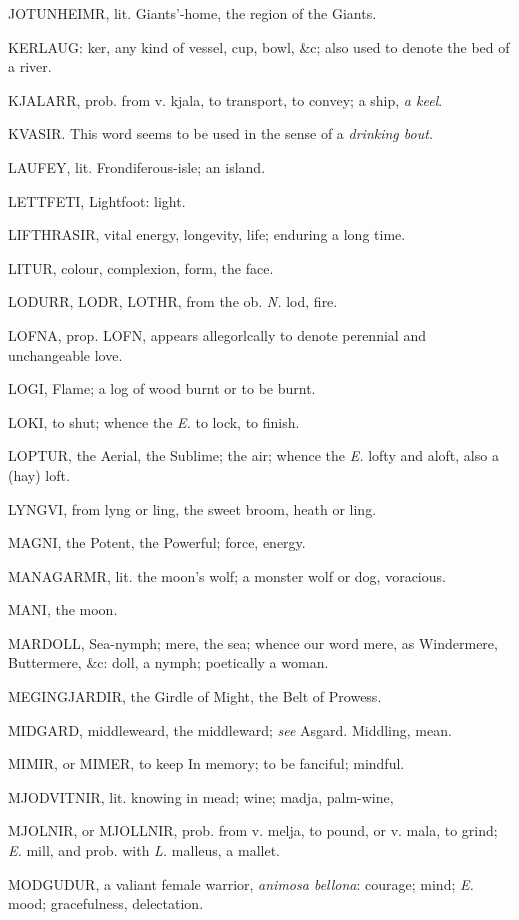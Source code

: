 JOTUNHEIMR, lit. Giants'-home, the region of the Giants.

KERLAUG: ker, any kind of vessel, cup, bowl, \&c; also used to denote
the bed of a river.

KJALARR, prob. from v. kjala, to transport, to convey; a ship, \emph{a
keel}.

KVASIR. This word seems to be used in the sense of a \emph{drinking bout.}

LAUFEY, lit. Frondiferous-isle; an island.

LETTFETI, Lightfoot: light.

LIFTHRASIR, vital energy, longevity, life; enduring a long time.

LITUR, colour, complexion, form, the face.

LODURR, LODR, LOTHR, from the ob. \emph{N.} lod, fire.

LOFNA, prop. LOFN, appears allegorlcally to denote perennial and
unchangeable love.

LOGI, Flame; a log of wood burnt or to be burnt.

LOKI, to shut; whence the \emph{E.} to lock, to finish.

LOPTUR, the Aerial, the Sublime; the air; whence the \emph{E.} lofty and
aloft, also a (hay) loft.

LYNGVI, from lyng or ling, the sweet broom, heath or ling.

MAGNI, the Potent, the Powerful; force, energy.

MANAGARMR, lit. the moon's wolf; a monster wolf or dog, voracious.

MANI, the moon.

MARDOLL, Sea-nymph; mere, the sea; whence our word mere, as
Windermere, Buttermere, \&c: doll, a nymph; poetically a woman.

MEGINGJARDIR, the Girdle of Might, the Belt of Prowess.

MIDGARD, middleweard, the middleward; \emph{see} Asgard. Middling, mean.

MIMIR, or MIMER, to keep In memory; to be fanciful; mindful.

MJODVITNIR, lit. knowing in mead; wine; madja, palm-wine,

MJOLNIR, or MJOLLNIR, prob. from v. melja, to pound, or v. mala, to
grind; \emph{E.} mill, and prob. with \emph{L.} malleus, a mallet.

MODGUDUR, a valiant female warrior, \emph{animosa bellona}: courage; mind;
\emph{E.} mood; gracefulness, delectation.

